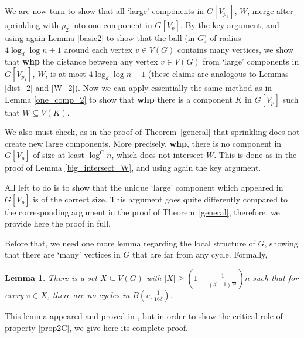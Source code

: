 \documentclass[notitlepage]{scrartcl}
\newtheorem{lemma}[thm]{Lemma}
\begin{document}
We are now turn to show that all `large' components in $G[V_{p_1}]$, $W$, merge after sprinkling with $p_2$ into one component in $G[V_p]$. By the key argument, and using again Lemma \ref{basic2} to show that the ball (in $G$) of radius $4\log_d\log n+1$ around each vertex $v\in V(G)$ contains many vertices, we show that \textbf{whp} the distance between any vertex $v\in V(G)$ from `large' components in $G[V_{p_1}]$, $W$, is at most $4\log_d\log n+1$ (these claims are analogous to Lemmas \ref{dist_2} and \ref{W_2}). Now we can apply essentially the same method as in Lemma \ref{one_comp_2} to show that \textbf{whp} there is a component $K$ in $G[V_p]$ such that $W\subseteq V(K)$. 

We also must check, as in the proof of Theorem~\ref{general} that sprinkling does not create new large components. More precisely, \textbf{whp}, there is no component in $G[V_p]$ of size at least $\log^C n$, which does not intersect $W$. This is done as in the proof of Lemma \ref{big_intersect_W}, and using again the key argument.

All left to do is to show that the unique `large' component which appeared in $G[V_p]$ is of the correct size. This argument goes quite differently compared to the corresponding argument in the proof of Theorem~\ref{general}, therefore, we provide here the proof in full.

Before that, we need one more lemma regarding the local structure of $G$, showing that there are ‘many’ vertices in $G$ that are far from any cycle. Formally,

\begin{lemma}\label{balls}
        There is a set $X \subseteq V(G)$ with $|X|\geq \left(1-\frac{1}{(d-1)^{\frac{1}{16\delta}}}\right)n$ such that for every $v \in X$, there are no cycles in $B\left(v,\frac{1}{16\delta}\right)$.
    \end{lemma}

This lemma appeared and proved in \cite{zbMATH08098276}, but in order to show the critical role of property \ref{prop2C}, we give here its complete proof.
\end{document}
